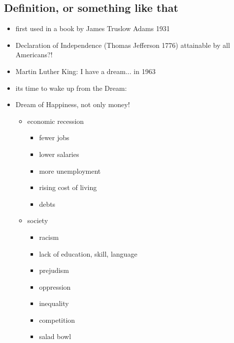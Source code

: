 \documentclass[a5paper,12pt,twoside,titlepage]{scrartcl}
\begin{document}
	\subsection{Definition, or something like that}
		\begin{itemize}
			\item first used in a book by James Truslow Adams 1931
			\item \textrightarrow Declaration of Independence (Thomas Jefferson 1776) attainable by all Americans?!
			\item Martin Luther King: I have a dream... in 1963
			\item \glqq its time to wake up from the Dream: \grqq 
			\item Dream of Happiness, not only money!
				\begin{itemize}
					\item economic recession
					\begin{itemize}
						\item fewer jobs
						\item lower salaries
						\item more unemployment
						\item rising cost of living
						\item debts
					\end{itemize}
					\item society
					\begin{itemize}
						\item racism
						\item lack of education, skill, language
						\item prejudism
						\item oppression
						\item inequality
						\item competition
						\item \glqq salad bowl\grqq
					\end{itemize}
				\end{itemize}
		\end{itemize}
\end{document}
